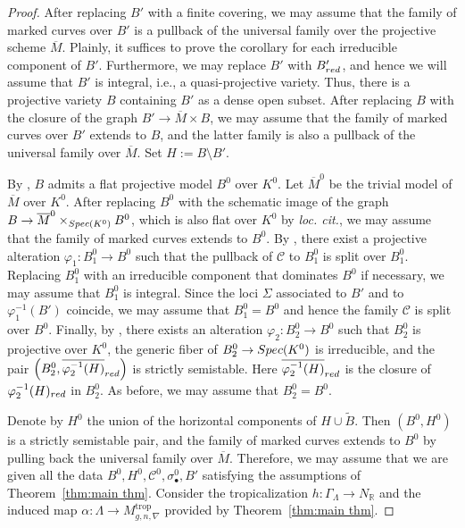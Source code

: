 \documentclass[11pt,reqno]{amsart}
\numberwithin{equation}{section}
\theoremstyle{definition}
\newcommand{\trop}{\mathrm{trop}}
\newcommand{\Spec}{{\rm Spec}}
\newcommand{\RR}{{\mathbb R}}
\def\:{\colon}
\newcommand{\cC}{{\mathcal{C}}}
\theoremstyle{remark}
\begin{document}
\begin{proof}
After replacing $B'$ with a finite covering, we may assume that the family of marked curves over $B'$ is a pullback of the universal family over the projective scheme $\overline M$. Plainly, it suffices to prove the corollary for each irreducible component of $B'$. Furthermore, we may replace $B'$ with $B'_{\rm red}$, and hence we will assume that $B'$ is integral, i.e., a quasi-projective variety. Thus, there is a projective variety $B$ containing $B'$ as a dense open subset. After replacing $B$ with the closure of the graph $B'\to \overline M \times B$, we may assume that the family of marked curves over $B'$ extends to $B$, and the latter family is also a pullback of the universal family over $\overline M$. Set $H:=B\setminus B'$. 

By \cite[\href{https://stacks.math.columbia.edu/tag/0C2S}{Tag~0C2S}]{stacks-project}, $B$ admits a flat projective model $B^0$ over $K^0$. Let $\overline M^0$ be the trivial model of $\overline M$ over $K^0$. After replacing $B^0$ with the schematic image of the graph $B\to \overline M^0 \times_{\Spec(K^0)} B^0$, which is also flat over $K^0$ by {\em loc. cit.}, we may assume that the family of marked curves extends to $B^0$. By \cite[Lemma~5.3]{dJ96}, there exist a projective alteration $\varphi_1 \colon B_1^0 \to B^0$ such that the pullback of $\cC$ to $B_1^0$ is split over $B_1^0$. Replacing $B_1^0$ with an irreducible component that dominates $B^0$ if necessary, we may assume that $B_1^0$ is integral. Since the loci $\Sigma$ associated to $B'$ and to $\varphi_1^{-1}(B')$ coincide, we may assume that $B_1^0=B^0$ and hence the family $\cC$ is split over $B^0$.
Finally, by \cite[Theorem~6.5]{dJ96}, there exists an alteration $\varphi_2 \colon B_2^0 \to B^0$ such that $B_2^0$ is projective over $K^0$, the generic fiber of $B_2^0\to\Spec(K^0)$ is irreducible, and the pair $\left(B_2^0, \overline{\varphi_2^{-1}(H)}_{\rm red}\right)$ is strictly semistable. Here $\overline{\varphi_2^{-1}(H)}_{\rm red}$ is the closure of $\varphi_2^{-1}(H)_{\rm red}$ in $B_2^0$.
As before, we may assume that $B_2^0=B^0$. 

Denote by $H^0$ the union of the horizontal components of $H\cup \tilde{B}$. Then $(B^0, H^0)$ is a strictly semistable pair, and the family of marked curves extends to $B^0$ by pulling back the universal family over $\overline M$. Therefore, we may assume that we are given all the data $B^0, H^0, \cC^0, \sigma^0_\bullet, B'$ satisfying the assumptions of Theorem~\ref{thm:main thm}. Consider the tropicalization $h\: \Gamma_\Lambda\to N_\RR$ and the induced map $\alpha\:\Lambda\to M^{\trop}_{g,n,\nabla}$ provided by Theorem~\ref{thm:main thm}.


\end{proof}
\end{document}
